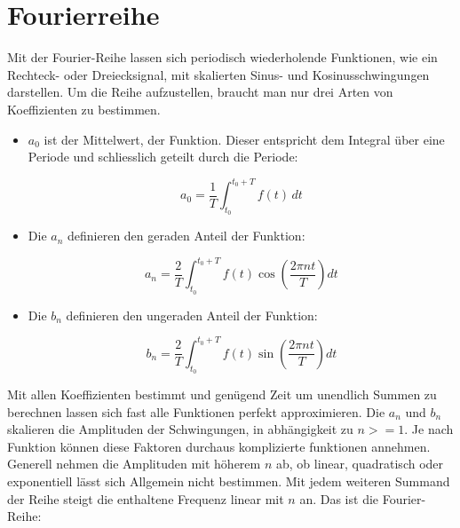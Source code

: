 %
%
%
%

\section{Fourierreihe\label{fourier:section:GrundlagenFourierAnalyse}}


Mit der Fourier-Reihe lassen sich periodisch wiederholende Funktionen, wie ein Rechteck- oder Dreiecksignal, mit skalierten Sinus- und Kosinusschwingungen darstellen. 
Um die Reihe aufzustellen, braucht man nur drei Arten von Koeffizienten zu bestimmen. 

\begin{itemize}
	\item $a_0$ ist der Mittelwert, der Funktion. 
	Dieser entspricht dem Integral über eine Periode und schliesslich geteilt durch die Periode: 
	
	\begin{equation}
		a_0 = \frac{1}{T} \int_{t_0}^{t_0 + T} f(t) \, dt
	\end{equation}
	
	\item Die $a_n$ definieren den geraden Anteil der Funktion:
	
	\begin{equation}
		a_n = \frac{2}{T} \int_{t_0}^{t_0 + T} f(t) \cos\left(\frac{2\pi n t}{T}\right) dt
	\end{equation}
	
	\item Die $b_n$ definieren den ungeraden Anteil der Funktion:
	
	\begin{equation}
		b_n = \frac{2}{T} \int_{t_0}^{t_0 + T} f(t) \sin\left(\frac{2\pi n t}{T}\right) dt
	\end{equation}
	
\end{itemize}


Mit allen Koeffizienten bestimmt und genügend Zeit um unendlich Summen zu berechnen lassen sich fast alle Funktionen perfekt approximieren.
Die $a_n$ und $b_n$ skalieren die Amplituden der Schwingungen, in abhängigkeit zu $n>=1$. 
Je nach Funktion können diese Faktoren durchaus komplizierte funktionen annehmen.
Generell nehmen die Amplituden mit höherem $n$ ab, ob linear, quadratisch oder exponentiell lässt sich Allgemein nicht bestimmen.
Mit jedem weiteren Summand der Reihe steigt die enthaltene Frequenz linear mit $n$ an.
Das ist die Fourier-Reihe:


